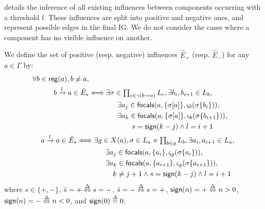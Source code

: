  details the inference of all existing influences between components occurring
with a threshold $l$.
These influences are split into positive and negative ones, and represent possible edges in the final IG.
We do not consider the cases where a component has no visible influence on another.
\begin{proposition}\label{pps:inference-edges}
We define the set of positive (resp. negative) influences $\hat{E}_+$ (resp. $\hat{E}_-$) for any
$a\in\Gamma$ by:
\begin{align}
\begin{split}
\forall b\in\mathsf{reg}({a}), b\neq a, \\
b\xrightarrow l a \in \hat{E}_s & \Longleftrightarrow
 \exists \sigma\in\textstyle\prod_{c\in\gamma(b\rightarrow a)} L_c, \exists b_i,b_{i+1}\in L_b,\\
& \qquad\qquad
        \exists a_{j}\in\mathsf{focals}(a, \{\sigma[a]\}, \varsigma_b(\sigma\{b_i\})), \\
& \qquad\qquad
        \exists a_{k}\in\mathsf{focals}(a, \{\sigma[a]\}, \varsigma_b(\sigma\{b_{i+1}\})), \\
& \qquad\qquad\qquad
                        s = \mathsf{sign}(k - j) \wedge l = i+1
\end{split}
\label{eq:edges-inference-b}
\\
\begin{split}
a \xrightarrow l a \in \hat{E}_s & \Longleftrightarrow
\exists g \in X(a), \sigma \in L_a\times \textstyle\prod_{b\in g} L_b,
			\exists a_i,a_{i+1}\in L_a, \\
& \qquad\qquad
        \exists a_{j}\in\mathsf{focals}(a, \{a_i\}, \varsigma_g(\sigma\{a_i\})), \\
& \qquad\qquad
        \exists a_{k}\in\mathsf{focals}(a, \{a_{i+1}\},  \varsigma_g(\sigma\{a_{i+1}\})), \\
& \qquad\qquad\quad
			k \neq j+1
				\wedge s = \mathsf{sign}(k - j) \wedge l = i+1
\end{split}
\label{eq:edges-inference-a}
\end{align}
where $s \in \{ +, - \}$, $\bar s = + \stackrel{\Delta}\Leftrightarrow s = -$, $\bar s = - \stackrel{\Delta}\Leftrightarrow s = +$,
$\mathsf{sign}(n) = + \stackrel{\Delta}\Leftrightarrow n > 0$,
$\mathsf{sign}(n) = - \stackrel{\Delta}\Leftrightarrow n < 0$,
and $\mathsf{sign}(0) \stackrel{\Delta}= 0$.
\end{proposition}

